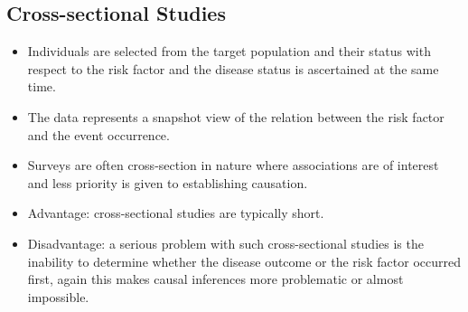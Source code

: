 \subsection{Cross-sectional Studies}
\begin{itemize}
    \item Individuals are selected from the target population and their
          status with respect to the risk factor and the disease status is
          ascertained at the same time.
    \item The data represents a snapshot view of the relation between
          the risk factor and the event occurrence.
    \item Surveys are often cross-section in nature where associations
          are of interest and less priority is given to establishing
          causation.
    \item Advantage: cross-sectional studies are typically short.
    \item Disadvantage: a serious problem with such cross-sectional
          studies is the inability to determine whether the disease
          outcome or the risk factor occurred first, again this makes
          causal inferences more problematic or almost impossible.
\end{itemize}
